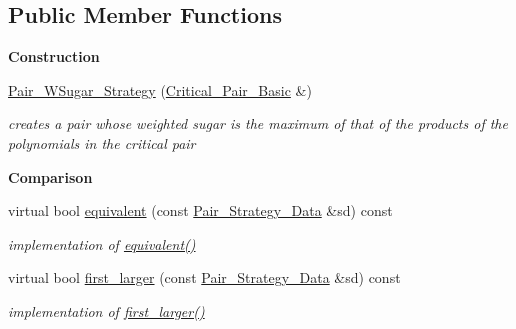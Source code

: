 \subsection*{Public Member Functions}
\begin{Indent}\textbf{ Construction}\par
\begin{DoxyCompactItemize}
\item 
\mbox{\label{class_pair___w_sugar___strategy_af06bcaf5995724fe80283e20f91151b1}} 
\hyperlink{class_pair___w_sugar___strategy_af06bcaf5995724fe80283e20f91151b1}{Pair\+\_\+\+W\+Sugar\+\_\+\+Strategy} (\hyperlink{class_critical___pair___basic}{Critical\+\_\+\+Pair\+\_\+\+Basic} \&)
\begin{DoxyCompactList}\small\item\em creates a pair whose weighted sugar is the maximum of that of the products of the polynomials in the critical pair \end{DoxyCompactList}\end{DoxyCompactItemize}
\end{Indent}
\begin{Indent}\textbf{ Comparison}\par
\begin{DoxyCompactItemize}
\item 
\mbox{\label{class_pair___w_sugar___strategy_a6a46188917beeab6617ff27d70356860}} 
virtual bool \hyperlink{class_pair___w_sugar___strategy_a6a46188917beeab6617ff27d70356860}{equivalent} (const \hyperlink{class_pair___strategy___data}{Pair\+\_\+\+Strategy\+\_\+\+Data} \&sd) const
\begin{DoxyCompactList}\small\item\em implementation of \hyperlink{class_pair___w_sugar___strategy_a6a46188917beeab6617ff27d70356860}{equivalent()} \end{DoxyCompactList}\item 
\mbox{\label{class_pair___w_sugar___strategy_afe1c908cbb040ee318bed323395c0441}} 
virtual bool \hyperlink{class_pair___w_sugar___strategy_afe1c908cbb040ee318bed323395c0441}{first\+\_\+larger} (const \hyperlink{class_pair___strategy___data}{Pair\+\_\+\+Strategy\+\_\+\+Data} \&sd) const
\begin{DoxyCompactList}\small\item\em implementation of \hyperlink{class_pair___w_sugar___strategy_afe1c908cbb040ee318bed323395c0441}{first\+\_\+larger()} \end{DoxyCompactList}\end{DoxyCompactItemize}
\end{Indent}
